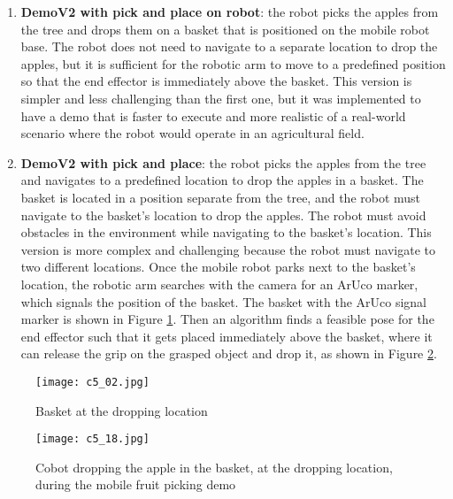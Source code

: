 \begin{enumerate}
    \item \textbf{DemoV2 with pick and place on robot}: the robot picks the apples from the tree and drops them on
    a basket that is positioned on the mobile robot base. The robot does not need to navigate to a separate location
    to drop the apples, but it is sufficient for the robotic arm to move to a predefined position so that
    the end effector is immediately above the basket. This version is simpler and less challenging than the first one,
    but it was implemented to have a demo that is faster to execute and more realistic of a real-world scenario
    where the robot would operate in an agricultural field.
    \item \textbf{DemoV2 with pick and place}: the robot picks the apples from the tree and navigates to a predefined
    location to drop the apples in a basket. The basket is located in a position separate from the tree, and the robot
    must navigate to the basket's location to drop the apples. The robot must avoid obstacles in the environment
    while navigating to the basket's location. This version is more complex and challenging because the robot must
    navigate to two different locations. Once the mobile robot parks next to the basket's location, the robotic
    arm searches with the camera for an ArUco marker, which signals the position of the basket. 
    The basket with the ArUco signal marker is shown in Figure \ref{fig:basket}. Then
    an algorithm finds a feasible pose for the end effector such that it gets placed immediately above the basket,
    where it can release the grip on the grasped object and drop it, as shown in Figure \ref{fig:mfp3}.
\end{enumerate}


\begin{figure}[t]
    \centering
    \texttt{[image: c5\_02.jpg]}
    \caption{Basket at the dropping location}
    \label{fig:basket}
\end{figure}

\begin{figure}[t]
    \centering
    \texttt{[image: c5\_18.jpg]}
    \caption{Cobot dropping the apple in the basket, at the dropping location, during the mobile fruit picking demo}
    \label{fig:mfp3}
\end{figure}

